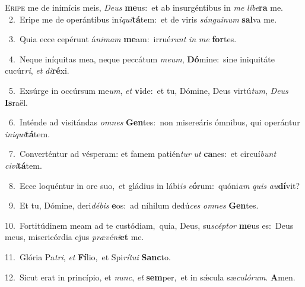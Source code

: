 \lettrine{\initial\textcolor{\initialcolor}{E}}{ripe} me de inimícis meis, \textit{De}\-\textit{us} \textbf{me}\-us:~\star et ab insurgéntibus in \textit{me} \textit{lí}\-\textit{be}\textbf{ra} me.\\
{\numbfont\textcolor{\numbcolor}{~2.}}~Eripe me de operántibus in\-\textit{i}\-\textit{qui}\textbf{tá}tem:~\star et de viris \textit{sán}\-\textit{gui}\textit{num} \textbf{sal}\-va me.\par
{\numbfont\textcolor{\numbcolor}{~3.}}~Quia ecce cepérunt á\-\textit{ni}\-\textit{mam} \textbf{me}\-am:~\star irrué\textit{runt} \textit{in} \textit{me} \textbf{for}\-tes.\par
{\numbfont\textcolor{\numbcolor}{~4.}}~Neque iníquitas mea, neque peccátum \textit{me}\-\textit{um}, \textbf{Dó}\-mine:~\star sine iniquitáte cucúr\-\textit{ri}\-, \textit{et} \textit{di}\-\textbf{ré}xi.\par
{\numbfont\textcolor{\numbcolor}{~5.}}~Exsúrge in occúrsum me\-\textit{um}\-, \textit{et} \textbf{vi}\-de:~\star et tu, Dómine, Deus virtú\-\textit{tum}\-, \textit{De}\-\textit{us} \textbf{Is}\-raël.\par
{\numbfont\textcolor{\numbcolor}{~6.}}~Inténde ad visitándas \textit{om}\-\textit{nes} \textbf{Gen}\-tes:~\star non misereáris ómnibus, qui operántur \textit{in}\-\textit{i}\textit{qui}\textbf{tá}tem.\par
{\numbfont\textcolor{\numbcolor}{~7.}}~Converténtur ad vésperam: et famem patién\textit{tur} \textit{ut} \textbf{ca}\-nes:~\star et circuí\textit{bunt} \textit{ci}\-\textit{vi}\textbf{tá}tem.\par
{\numbfont\textcolor{\numbcolor}{~8.}}~Ecce loquéntur in ore suo,~\dagger et gládius in lábi\textit{is} \textit{e}\-\textbf{ó}rum:~\star quóni\textit{am} \textit{quis} \textit{au}\-\textbf{dí}vit?\par
{\numbfont\textcolor{\numbcolor}{~9.}}~Et tu, Dómine, deri\-\textit{dé}\-\textit{bis} \textbf{e}\-os:~\star ad níhilum dedú\textit{ces} \textit{om}\-\textit{nes} \textbf{Gen}\-tes.\par
{\numbfont\textcolor{\numbcolor}{10.}}~Fortitúdinem meam ad te custódiam,~\dagger quia, Deus, su\-\textit{scép}\-\textit{tor} \textbf{me}\-us es:~\star Deus meus, misericórdia ejus \textit{præ}\-\textit{vé}\textit{ni}\textbf{et} me.\par
{\numbfont\textcolor{\numbcolor}{11.}}~Glória Pa\-\textit{tri}\-, \textit{et} \textbf{Fí}\-lio,~\star et Spi\-\textit{rí}\-\textit{tu}\textit{i} \textbf{Sanc}\-to.\par
{\numbfont\textcolor{\numbcolor}{12.}}~Sicut erat in princípio, et \textit{nunc}\-, \textit{et} \textbf{sem}\-per,~\star et in sǽcula sæ\-\textit{cu}\-\textit{ló}\textit{rum}. \textbf{A}\-men.\par
